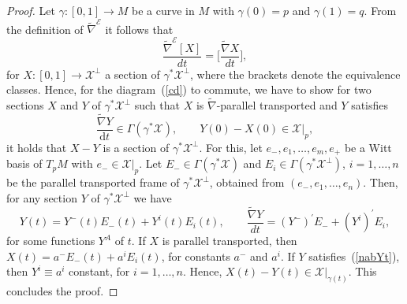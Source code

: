 \documentclass[11pt,a4paper]{amsart}
\newcommand{\tnab}{\widetilde{\nabla}}
\newcommand{\+}{\oplus}
\newcommand{\1}{\mathbf{1}}
\renewcommand{\d}{\mathrm{d}}
\newcommand{\E}{\mathcal{E}}
\newcommand{\tnabE}{\tnab^{\mathcal{E}}}
\newcommand{\<}{\langle}
\renewcommand{\>}{\rangle}
\theoremstyle{definition}
\theoremstyle{plain}
\numberwithin{equation}{section}
\begin{document}
\begin{proof}
Let $\gamma:[0,1]\to M$ be a curve in $M$ with $\gamma(0)=p$ and $\gamma(1)=q$.
From the definition of $\tnab^\E$ it follows that
\[
\frac{\tnabE [X]}{dt}=\bigg[\frac{\tnab X }{dt}\bigg],\]
for $X:[0,1]\to \mathcal X^\perp$ a section of $\gamma^*\mathcal X^\perp$, where the brackets denote the equivalence classes.
Hence, for the diagram~(\ref{cd}) to commute, we have to show  for two sections $X$ and $Y$ of $\gamma^*\mathcal X^\perp$ such that $X$ is $\tnab$-parallel transported and $Y$ satisfies 
\begin{equation}\label{nabYt} \frac{\tnab Y}{\d t}\in \Gamma(\gamma^*\mathcal X),\qquad 
Y(0)-X(0)\in \mathcal X|_p,
\end{equation}
it holds that $X-Y$ is a section of $\gamma^*\mathcal X^\perp$.
For this, let $e_-, e_1, \ldots, e_m,e_+$ be a Witt basis of $T_pM$ with $e_-\in \mathcal X|_p$. Let $E_-\in \Gamma (\gamma^*\mathcal X )$ and $E_i \in \Gamma (\gamma^*\mathcal X^\perp )$, $i=1, \ldots, n$  be the parallel transported frame of $\gamma^*\mathcal X^\perp$, obtained from $(e_-, e_1,\ldots, e_n)$. 
Then, for any  section $Y$ of $\gamma^*\mathcal X^\perp$ we have
 \[Y(t)=Y^-(t) E_-(t)+Y^i(t)E_i(t),\qquad \frac{\tnab Y}{dt}= (Y^-)^\prime E_-+(Y^i)^\prime E_i,
 \]
 for some functions $Y^A$ of $t$.
If $X$ is parallel transported, then
$X(t)=a^-E_-(t)+ a^i E_i(t)$, 
for constants $a^-$ and $a^i$. If $Y$ satisfies~(\ref{nabYt}), then  $Y^i\equiv a^i$ constant, for $i=1, \ldots, n$.
Hence, $X(t)-Y(t)\in\mathcal X|_{\gamma(t)}$. This concludes the proof. 
\end{proof}
\end{document}

